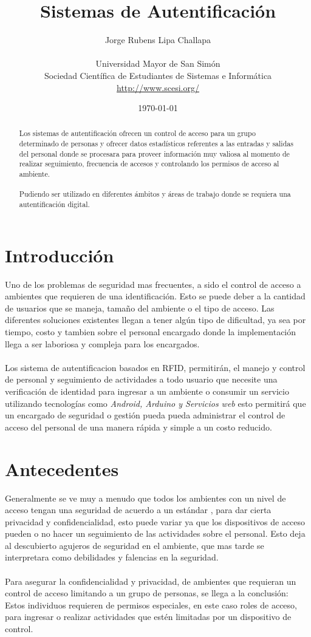\documentclass[11pt,twocolumn]{article}
\title{
\vspace{-3cm}   
Sistemas de Autentificaci\'on
}
\author{ 
Jorge Rubens Lipa Challapa\\
\\
Universidad Mayor de San Sim\'on \\
Sociedad Cient\'ifica de Estudiantes de Sistemas e Inform\'atica\\
\url {http://www.scesi.org/}
}
\date{ \today }
\begin{document}
\maketitle

\begin{abstract} 
Los sistemas de autentificaci\'on ofrecen un control de 
acceso para un grupo determinado de personas y ofrecer datos estad\'isticos 
referentes a las entradas y salidas del personal donde se procesara para 
proveer informaci\'on muy valiosa al momento de realizar seguimiento, 
frecuencia de accesos y controlando los permisos de acceso al ambiente.\\
\\
 Pudiendo ser utilizado en diferentes \'ambitos y \'areas de
 trabajo donde se requiera una autentificaci\'on digital.
\end{abstract}

\section{Introducci\'on}
Uno de los problemas de seguridad mas frecuentes,  a sido el control de acceso 
a ambientes que requieren de una identificaci\'on. Esto se puede deber a  la 
cantidad de usuarios que se maneja, tama\~no del ambiente o el tipo de acceso. 
Las diferentes soluciones existentes llegan a tener alg\'un tipo de dificultad, 
ya sea por tiempo, costo y tambien sobre el personal encargado donde la 
implementaci\'on llega a ser laboriosa y compleja para los encargados.\\
\\
Los sistema de autentificacion basados en RFID, 
permitir\'an, el manejo y control de personal y seguimiento de actividades a
 todo usuario que necesite una verificaci\'on de identidad para ingresar a un
 ambiente o consumir un servicio utilizando tecnolog\'ias como \textit{Android,
 Arduino y Servicios web} esto permitir\'a que un encargado de seguridad o 
gesti\'on pueda pueda administrar el control de acceso del personal de una 
manera r\'apida y simple a un costo reducido.\\

\section{Antecedentes}

Generalmente se ve muy a menudo que todos los ambientes  con un nivel de acceso 
tengan una seguridad de acuerdo a un est\'andar , para dar cierta privacidad y 
confidencialidad, esto puede variar ya que los dispositivos de acceso pueden o 
no hacer un seguimiento de las actividades sobre el personal. Esto deja al 
descubierto agujeros de seguridad en el ambiente, que mas tarde se interpretara 
como debilidades y falencias en la seguridad.\\
\\
Para asegurar la confidencialidad y privacidad, de ambientes que requieran un 
control de acceso limitando a un grupo de personas, se llega a la conclusi\'on: 
Estos individuos  requieren de permisos especiales, en este caso roles de 
acceso, para ingresar o realizar actividades que est\'en limitadas por un 
dispositivo de control. \\
\end{document}

